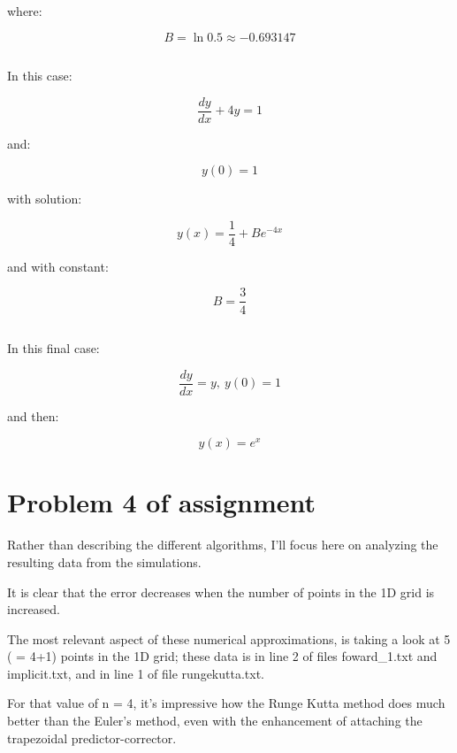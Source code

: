 \documentclass[paper=a4, fontsize=11pt]{scrartcl} %
\numberwithin{equation}{section} %
\numberwithin{figure}{section} %
\numberwithin{table}{section} %
\begin{document}
where:

\begin{equation}
B = \ln 0.5 \approx -0.693147
\end{equation}


\subsection{}

In this case:

\begin{equation}
\frac{dy}{dx}+4y = 1
\end{equation}

and:

\begin{equation}
y(0) = 1
\end{equation}

with solution:

\begin{equation}
y(x) = \frac{1}{4} + Be^{-4x}
\end{equation}

and with constant:

\begin{equation}
B=\frac{3}{4}
\end{equation}



\subsection{}

In this final case:

\begin{equation}
\frac{dy}{dx} = y, \ y(0) = 1
\end{equation}

and then:

\begin{equation}
y(x) = e^{x}
\end{equation}


\section{Problem 4 of assignment}

Rather than describing the different algorithms, I'll focus here on analyzing the resulting data from the simulations.

It is clear that the error decreases when the number of points in the 1D grid is increased.

The most relevant aspect of these numerical approximations, is taking a look at 5 ( = 4+1) points in the 1D grid; these data is in line 2 of files foward\_1.txt and implicit.txt, and in line 1 of file rungekutta.txt.

For that value of n = 4, it's impressive how the Runge Kutta method does much better than the Euler's method, even with the enhancement of attaching the trapezoidal predictor-corrector.
\end{document}
